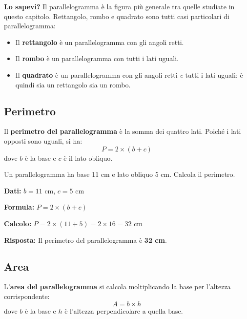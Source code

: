 \begin{sapevi}
    \textbf{Lo sapevi?} Il parallelogramma è la figura più generale tra quelle studiate in questo capitolo. Rettangolo, rombo e quadrato sono tutti casi particolari di parallelogramma:
    \begin{itemize}[leftmargin=1.5em]
        \item Il \textbf{rettangolo} è un parallelogramma con gli angoli retti.
        \item Il \textbf{rombo} è un parallelogramma con tutti i lati uguali.
        \item Il \textbf{quadrato} è un parallelogramma con gli angoli retti \emph{e} tutti i lati uguali: è quindi sia un rettangolo sia un rombo.
    \end{itemize}
\end{sapevi}

\subsection{Perimetro}

\begin{regola}
    Il \textbf{perimetro del parallelogramma} è la somma dei quattro lati. Poiché i lati opposti sono uguali, si ha:
    \[
        P = 2 \times (b + c)
    \]
    dove $b$ è la base e $c$ è il lato obliquo.
\end{regola}

\begin{esempio}
    Un parallelogramma ha base 11 cm e lato obliquo 5 cm. Calcola il perimetro.

    \medskip
    \textbf{Dati:} $b = 11$ cm, $c = 5$ cm

    \textbf{Formula:} $P = 2 \times (b + c)$

    \textbf{Calcolo:} $P = 2 \times (11 + 5) = 2 \times 16 = 32$ cm

    \textbf{Risposta:} Il perimetro del parallelogramma è \textbf{32 cm}.
\end{esempio}

\subsection{Area}

\begin{regola}
    L'\textbf{area del parallelogramma} si calcola moltiplicando la base per l'altezza corrispondente:
    \[
        A = b \times h
    \]
    dove $b$ è la base e $h$ è l'altezza perpendicolare a quella base.
\end{regola}

